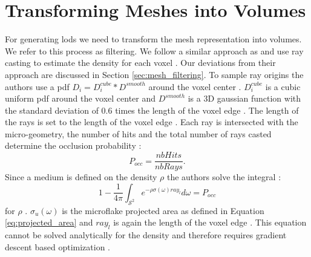 \section{Transforming Meshes into Volumes}
\label{sec:transforming_meshes_into_volumes}
For generating \acp{lod} we need to transform the mesh representation into volumes.
We refer to this process as filtering.
We follow a similar approach as \citeauthor{hybrid_mesh_volume_lods} and use ray casting to estimate the density for each voxel \cite{hybrid_mesh_volume_lods}.
Our deviations from their approach are discussed in Section \ref{sec:mesh_filtering}.
To sample ray origins the authors use a \ac{pdf} $D_i=D_i^{cube} \ast D^{smooth}$ around the voxel center \cite{hybrid_mesh_volume_lods}.
$D_i^{cube}$ is a cubic uniform \ac{pdf} around the voxel center and $D^{smooth}$ is a 3D gaussian function with the standard deviation of 0.6 times the length of the voxel edge \cite{hybrid_mesh_volume_lods}.
The length of the rays is set to the length of the voxel edge \cite{hybrid_mesh_volume_lods}.
Each ray is intersected with the micro-geometry, the number of hits and the total number of rays casted determine the occlusion probability \cite{hybrid_mesh_volume_lods}:
\begin{equation*}
    P_{occ}=\frac{nbHits}{nbRays}.
\end{equation*}
Since a medium is defined on the density $\rho$ the authors solve the integral \cite{hybrid_mesh_volume_lods}:
\begin{equation}
    1 - \frac{1}{4\pi}\int_{\mathcal{S}^2} e^{-\rho\sigma(\omega)ray_l} d\omega = P_{occ}
    \label{eq:loubet_filtering_equation}
\end{equation}
for $\rho$ \cite{hybrid_mesh_volume_lods}.
$\sigma_u(\omega)$ is the microflake projected area as defined in Equation \ref{eq:projected_area} and $ray_l$ is again the length of the voxel edge \cite{hybrid_mesh_volume_lods}.
This equation cannot be solved analytically for the density and therefore requires gradient descent based optimization \cite{hybrid_mesh_volume_lods}.





